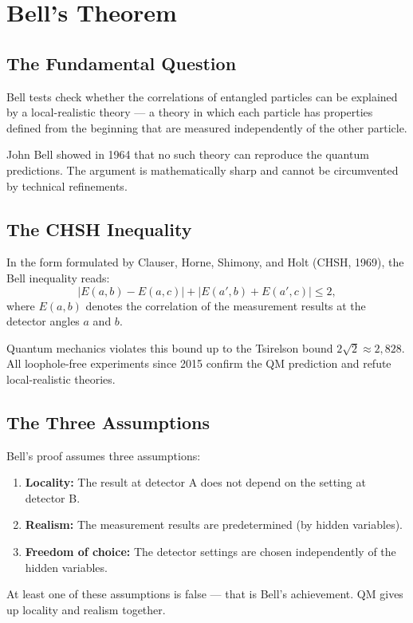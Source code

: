 \chapter{Bell's Theorem}
\label{ch:bell}

\section{The Fundamental Question}

Bell tests check whether the correlations of entangled particles can be explained by
a local-realistic theory — a theory
in which each particle has properties defined from the beginning
that are measured independently of the other particle.

John Bell showed in 1964 that no such theory can reproduce the
quantum predictions. The argument is
mathematically sharp and cannot be circumvented by technical refinements.

\section{The CHSH Inequality}

In the form formulated by Clauser, Horne, Shimony, and Holt
(CHSH, 1969), the Bell inequality reads:
\begin{equation}
  |E(a,b)-E(a,c)| + |E(a',b)+E(a',c)| \le 2,
  \label{eq:chsh}
\end{equation}
where $E(a,b)$ denotes the correlation of the measurement results at the
detector angles $a$ and $b$.

Quantum mechanics violates this bound up to the
Tsirelson bound $2\sqrt2\approx2{,}828$. All
loophole-free experiments since 2015 confirm the
QM prediction and refute local-realistic theories.

\section{The Three Assumptions}

Bell's proof assumes three assumptions:
\begin{enumerate}
  \item \textbf{Locality:} The result at detector A does not depend
        on the setting at detector B.
  \item \textbf{Realism:} The measurement results are predetermined
        (by hidden variables).
  \item \textbf{Freedom of choice:} The detector settings are chosen
        independently of the hidden variables.
\end{enumerate}
At least one of these assumptions is false — that is Bell's
achievement. QM gives up locality and realism together.

